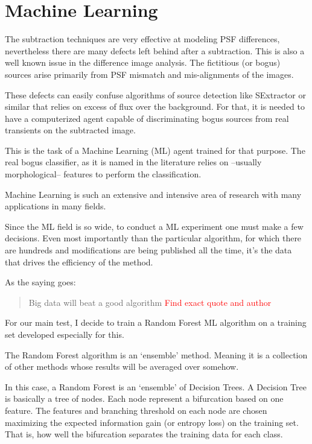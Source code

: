 \chapter{Machine Learning}

The subtraction techniques are very effective at  modeling PSF differences, nevertheless there are many defects left behind after a subtraction. This is also a well known issue in the difference image analysis. The fictitious (or bogus) sources arise primarily from PSF mismatch and mis-alignments of the images.

These defects can easily confuse algorithms of source detection like SExtractor or similar that relies on excess of flux over the background. For that, it is needed to have a computerized agent capable of discriminating bogus sources from real transients on the subtracted image. 

This is the task of a Machine Learning (ML) agent trained for that purpose. The real bogus classifier, as it is named in the literature relies on --usually morphological-- features to perform the classification.

Machine Learning is such an extensive and intensive area of research with many applications in many fields.

Since the ML field is so wide, to conduct a ML experiment one must make a few decisions. Even most importantly than the particular algorithm, for which there are hundreds and modifications are being published all the time, it's the data that drives the efficiency of the method.

As the saying goes:

\begin{quotation}
Big data will beat a good algorithm \textcolor{red}{Find exact quote and author}
\end{quotation}


For our main test, I decide to train a Random Forest ML algorithm on a training set developed especially for this.

The Random Forest algorithm is an `ensemble' method. Meaning it is a collection of other methods whose results will be averaged over somehow.

In this case, a Random Forest is an `ensemble' of Decision Trees. A Decision Tree is basically a tree of nodes. Each node represent a bifurcation based on one feature. The features and branching threshold on each node are chosen maximizing the expected information gain (or entropy loss) on the training set. That is, how well the bifurcation separates the training data for each class.

